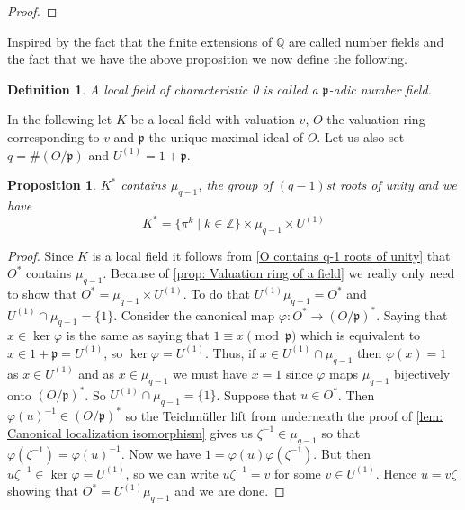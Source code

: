 \documentclass{article}
\newtheorem{definition}{Definition}[section]
\newtheorem{proposition}{Proposition}[section]
\newcommand{\mfrak}[1]{\mathfrak{#1}}
\newcommand{\mbb}[1]{\mathbb{#1}}
\numberwithin{equation}{section}
\begin{document}
\begin{proof}
\end{proof}

Inspired by the fact that the finite extensions of $\mbb Q$ are called number fields and the fact that we have the above proposition we now define the following.

\begin{definition}
	A local field of characteristic 0 is called a $\mfrak p$-adic number field. %
\end{definition}

In the following let $K$ be a local field with valuation $v$, $O$ the valuation ring corresponding to $v$ and $\mfrak p$ the unique maximal ideal of $O$. Let us also set $q = \#(O / \mfrak p)$ and $U^{(1)} = 1 + \mfrak p$.
\begin{proposition}\label{prop: Factorization of elements in K^*}
	$K^*$ contains $\mu_{q-1}$, the group of $(q-1)$st roots of unity and we have
	$$K^* = \{\pi^k \mid k \in \mbb Z \} \times \mu_{q-1} \times U^{(1)}$$
\end{proposition}
\begin{proof}
	Since $K$ is a local field it follows from \cref{O contains q-1 roots of unity} that $O^*$ contains $\mu_{q-1}$. Because of \cref{prop: Valuation ring of a field} we really only need to show that $O^* = \mu_{q-1} \times U^{(1)}$. To do that $U^{(1)} \mu_{q-1} = O^*$ and $U^{(1)} \cap \mu_{q-1} = \{1\}$. Consider the canonical map $\varphi : O^* \to (O / \mfrak p)^*$. Saying that $x \in \ker \varphi$ is the same as saying that $1 \equiv x \pmod{\mfrak p}$ which is equivalent to $x \in 1 + \mfrak p = U^{(1)}$, so $\ker \varphi = U^{(1)}$. Thus, if $x \in U^{(1)} \cap \mu_{q-1}$ then $\varphi(x) = 1$ as $x \in U^{(1)}$ and as $x \in \mu_{q-1}$ we must have $x = 1$ since $\varphi$ maps $\mu_{q-1}$ bijectively onto $(O/\mfrak p)^*$. So $U^{(1)} \cap \mu_{q-1} = \{ 1 \}$. Suppose that $u \in O^*$. Then $\varphi(u)^{-1} \in (O/\mfrak p)^*$ so the Teichmüller lift from underneath the proof of \cref{lem: Canonical localization isomorphism} gives us $\zeta^{-1} \in \mu_{q-1}$ so that $\varphi(\zeta^{-1}) = \varphi(u)^{-1}$. Now we have $1 = \varphi(u)\varphi(\zeta^{-1})$. But then $u\zeta^{-1} \in \ker \varphi = U^{(1)}$, so we can write $u\zeta^{-1} = v$ for some $v \in U^{(1)}$. Hence $u = v \zeta$ showing that $O^* = U^{(1)}\mu_{q-1}$ and we are done.
\end{proof}
\end{document}
